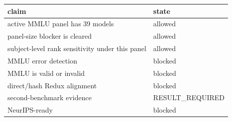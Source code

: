 \begin{tabular}{ll}
\toprule
claim & state \\
\midrule
active MMLU panel has 39 models & allowed \\
panel-size blocker is cleared & allowed \\
subject-level rank sensitivity under this panel & allowed \\
MMLU error detection & blocked \\
MMLU is valid or invalid & blocked \\
direct/hash Redux alignment & blocked \\
second-benchmark evidence & RESULT\_REQUIRED \\
NeurIPS-ready & blocked \\
\bottomrule
\end{tabular}
